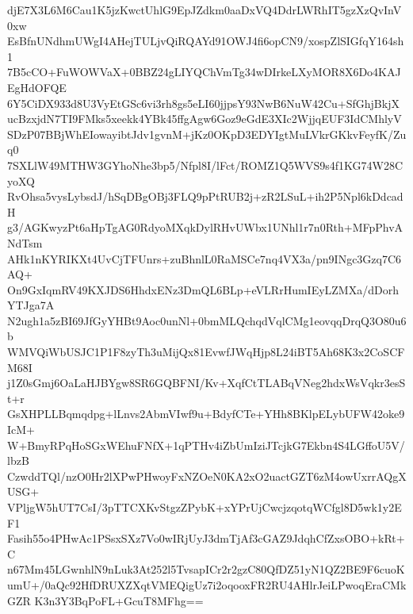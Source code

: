 djE7X3L6M6Cau1K5jzKwctUhlG9EpJZdkm0aaDxVQ4DdrLWRhIT5gzXzQvInV0xw
EsBfnUNdhmUWgI4AHejTULjvQiRQAYd91OWJ4fi6opCN9/xospZlSIGfqY164sh1
7B5cCO+FuWOWVaX+0BBZ24gLIYQChVmTg34wDIrkeLXyMOR8X6Do4KAJEgHdOFQE
6Y5CiDX933d8U3VyEtGSc6vi3rh8gs5eLI60jjpsY93NwB6NuW42Cu+SfGhjBkjX
ucBzxjdN7TI9FMks5xeekk4YBk45ffgAgw6Goz9eGdE3XIc2WjjqEUF3IdCMhlyV
SDzP07BBjWhEIowayibtJdv1gvnM+jKz0OKpD3EDYIgtMuLVkrGKkvFeyfK/Zuq0
7SXLlW49MTHW3GYhoNhe3bp5/Nfpl8I/lFct/ROMZ1Q5WVS9s4f1KG74W28CyoXQ
RvOhsa5vysLybsdJ/hSqDBgOBj3FLQ9pPtRUB2j+zR2LSuL+ih2P5Npl6kDdcadH
g3/AGKwyzPt6aHpTgAG0RdyoMXqkDylRHvUWbx1UNhl1r7n0Rth+MFpPhvANdTsm
AHk1nKYRIKXt4UvCjTFUnrs+zuBhnlL0RaMSCe7nq4VX3a/pn9INgc3Gzq7C6AQ+
On9GxIqmRV49KXJDS6HhdxENz3DmQL6BLp+eVLRrHumIEyLZMXa/dDorhYTJga7A
N2ugh1a5zBI69JfGyYHBt9Aoc0unNl+0bmMLQchqdVqlCMg1eovqqDrqQ3O80u6b
WMVQiWbUSJC1P1F8zyTh3uMijQx81EvwfJWqHjp8L24iBT5Ah68K3x2CoSCFM68I
j1Z0sGmj6OaLaHJBYgw8SR6GQBFNI/Kv+XqfCtTLABqVNeg2hdxWsVqkr3esSt+r
GsXHPLLBqmqdpg+lLnvs2AbmVIwf9u+BdyfCTe+YHh8BKlpELybUFW42oke9IcM+
W+BmyRPqHoSGxWEhuFNfX+1qPTHv4iZbUmIziJTcjkG7Ekbn4S4LGffoU5V/lbzB
CzwddTQl/nzO0Hr2lXPwPHwoyFxNZOeN0KA2xO2uactGZT6zM4owUxrrAQgXUSG+
VPljgW5hUT7CsI/3pTTCXKvStgzZPybK+xYPrUjCwcjzqotqWCfgl8D5wk1y2EF1
Fasih55o4PHwAc1PSsxSXz7Vo0wIRjUyJ3dmTjAf3cGAZ9JdqhCfZxsOBO+kRt+C
n67Mm45LGwnhlN9nLuk3At252l5TvsapICr2r2gzC80QfDZ51yN1QZ2BE9F6cuoK
umU+/0aQc92HfDRUXZXqtVMEQigUz7i2oqooxFR2RU4AHlrJeiLPwoqEraCMkGZR
K3n3Y3BqPoFL+GcuT8MFhg==
